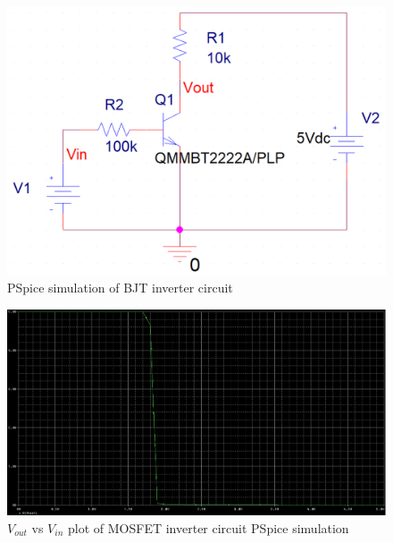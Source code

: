 \documentclass{article}
\begin{document}
\begin{figure}[H]
  \centering
  \includegraphics[width=\textwidth]{ECE2200L_Lab9_PSpice_schematic_B.png}
  \caption{PSpice simulation of BJT inverter circuit}
  \label{fig:cktb}
\end{figure}
\newpage
\begin{figure}[H]
  \centering
  \includegraphics[width=\textwidth]{ECE2200L_Lab9_PSpice_plot_A.png}
  \caption{$V_{out}$ vs $V_{in}$ plot of MOSFET inverter circuit PSpice simulation}
  \label{fig:plota}
\end{figure}
\end{document}
